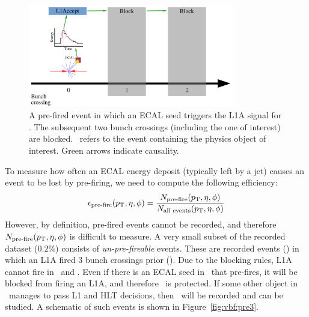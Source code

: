 \begin{figure}
    \begin{center}
        \includegraphics[width=0.8\textwidth,page=2]{figures/vbf/triggers/l1diag.pdf}
        \caption{A pre-fired event in which an ECAL seed triggers the L1A signal for . 
                 The subsequent two bunch crossings (including the one of interest) are blocked. 
                 ~refers to the event containing the physics object of interest.
                 Green arrows indicate causality.}
        \label{fig:vbf:pre2}
    \end{center}
\end{figure}

To measure how often an ECAL energy deposit (typically left by a jet) causes an event to be lost by pre-firing, we need to compute the following efficiency:
\begin{equation}
    \epsilon_\text{pre-fire}(p_\mathrm{T},\eta,\phi) = \frac{N_\text{pre-fire}(p_\mathrm{T},\eta,\phi)}{N_\text{all events}(p_\mathrm{T},\eta,\phi)}
\end{equation}
However, by definition, pre-fired events cannot be recorded, and therefore $N_\text{pre-fire}(p_\mathrm{T},\eta,\phi)$ is difficult to measure.
A very small subset of the recorded dataset ($0.2\%$) consists of \emph{un-pre-fireable} events.
These are recorded events () in which an L1A fired 3 bunch crossings prior ().
Due to the blocking rules, L1A cannot fire in ~and .
Even if there is an ECAL seed in ~that pre-fires, it will be blocked from firing an L1A, and therefore ~is protected.
If some other object in ~manages to pass L1 and HLT decisions, then ~will be recorded and can be studied.
A schematic of such events is shown in Figure~\ref{fig:vbf:pre3}.


